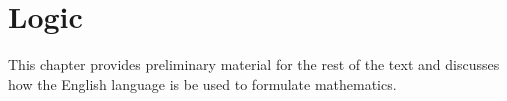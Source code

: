 \begingroup
    \ifcsname\PATH\endcsname
        \newcommand{\PATH}{books/Foundations/Logic}
        \newcommand{\OLDPATH}{\PATH}
    \else
        \newcommand{\OLDPATH}{\PATH}
        \renewcommand{\PATH}{books/Foundations/Logic}
    \fi
    \chapter{Logic}
        \label{chapt:Logic}%
        This chapter provides preliminary material for the rest of the text and
        discusses how the English language is be used to formulate mathematics.
        
        
    \renewcommand{\PATH}{\OLDPATH}
\endgroup